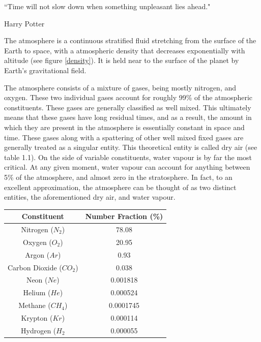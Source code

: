 \epigraph{``Time will not slow down when something unpleasant lies ahead."}{Harry Potter}

\begin{definition}
The atmosphere is a continuous stratified fluid stretching from the surface of the Earth to space, with a atmospheric density that decreases exponentially with altitude (see figure \ref{density}). It is held near to the surface of the planet by Earth's gravitational field. 
\end{definition}

The atmosphere consists of a mixture of gases, being mostly nitrogen, and oxygen. These two individual gases account for roughly 99\% of the atmospheric constituents. These gases are generally classified as well mixed. This ultimately means that these gases have long residual times, and as a result, the amount in which they are present in the atmosphere is essentially constant in space and time. These gases along with a spattering of other well mixed fixed gases are generally treated as a singular entity. This theoretical entity is called dry air (see table 1.1). On the side of variable constituents, water vapour is by far the most critical. At any given moment, water vapour can account for anything between 5\% of the atmosphere, and almost zero in the stratosphere. In fact, to an excellent approximation, the atmosphere can be thought of as two distinct entities, the aforementioned dry air, and water vapour\cite{iop}.

\begin{center}
\begin{tabular}{c c} 
 \hline
 Constituent & Number Fraction (\%) \\
 \hline
 Nitrogen ($N_2$) & 78.08 \\
 Oxygen ($O_2$) & 20.95 \\
 Argon ($Ar$) & 0.93 \\
 Carbon Dioxide ($CO_2$) & 0.038 \\
 Neon ($Ne$) & 0.001818 \\
 Helium ($He$) & 0.000524 \\
 Methane ($CH_4$) & 0.0001745 \\
 Krypton ($Kr$) & 0.000114 \\
 Hydrogen ($H_2$ & 0.000055 \\
\end{tabular}\par
\end{center}

\hfill

